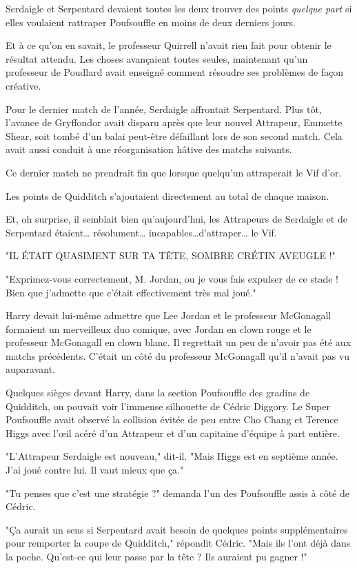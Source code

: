Serdaigle et Serpentard devaient toutes les deux trouver des points \emph{quelque part}  si elles voulaient rattraper Poufsouffle en moins de deux derniers jours.

Et à ce qu'on en savait, le professeur Quirrell n'avait rien fait pour obtenir le résultat attendu. Les choses avançaient toutes seules, maintenant qu'un professeur de Poudlard avait enseigné comment résoudre ses problèmes de façon créative.

Pour le dernier match de l'année, Serdaigle affrontait Serpentard. Plus tôt, l'avance de Gryffondor avait disparu après que leur nouvel Attrapeur, Emmette Shear, soit tombé d'un balai peut-être défaillant lors de son second match. Cela avait aussi conduit à une réorganisation hâtive des matchs suivants.

Ce dernier match ne prendrait fin que lorsque quelqu'un attraperait le Vif d'or.

Les points de Quidditch s'ajoutaient directement au total de chaque maison.

Et, oh surprise, il semblait bien qu'aujourd'hui, les Attrapeurs de Serdaigle et de Serpentard étaient… résolument… incapables…d'attraper… le Vif.

"IL ÉTAIT QUASIMENT SUR TA TÊTE, SOMBRE CRÉTIN AVEUGLE !"

"Exprimez-vous correctement, M. Jordan, ou je vous fais expulser de ce stade ! Bien que j'admette que c'était effectivement très mal joué."

Harry devait lui-même admettre que Lee Jordan et le professeur McGonagall formaient un merveilleux duo comique, avec Jordan en clown rouge et le professeur McGonagall en clown blanc. Il regrettait un peu de n'avoir pas été aux matchs précédents. C'était un côté du professeur McGonagall qu'il n'avait pas vu auparavant.

Quelques sièges devant Harry, dans la section Poufsouffle des gradins de Quidditch, on pouvait voir l'immense silhouette de Cédric Diggory. Le Super Poufsouffle avait observé la collision évitée de peu entre Cho Chang et Terence Higgs avec l'œil acéré d'un Attrapeur et d'un capitaine d'équipe à part entière.

"L'Attrapeur Serdaigle est nouveau," dit-il. "Mais Higgs est en septième année. J'ai joué contre lui. Il vaut mieux que ça."

"Tu penses que c'est une stratégie ?" demanda l'un des Poufsouffle assis à côté de Cédric.

"Ça aurait un sens si Serpentard avait besoin de quelques points supplémentaires pour remporter la coupe de Quidditch," répondit Cédric. "Mais ils l'ont déjà dans la poche. Qu'est-ce qui leur passe par la tête ? Ils auraient pu gagner !"

